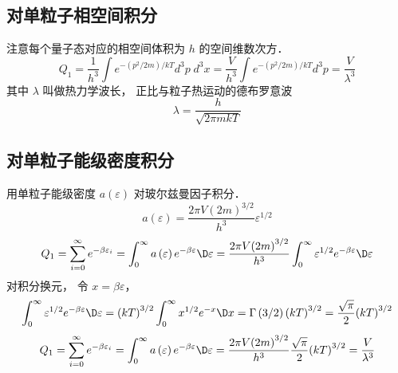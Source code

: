 \subsection{对单粒子相空间积分}
注意每个量子态对应的相空间体积为 $h$ 的空间维数次方．
\begin{equation}
{Q_1} = \frac{1}{{{h^3}}}\int {{e^{ - ({p^2}/2m)/kT}}{d^3}p\;{d^3}x}  = \frac{V}{{{h^3}}}\int {{e^{ - ({p^2}/2m)/kT}}{d^3}p}  = \frac{V}{{{\lambda ^3}}}
\end{equation}
其中 $\lambda $ 叫做热力学波长， 正比与粒子热运动的德布罗意波
\begin{equation}
\lambda  = \frac{h}{{\sqrt {2\pi mkT} }}
\end{equation}

\subsection{对单粒子能级密度积分}
用单粒子能级密度 $a\left( \varepsilon  \right)$ 对玻尔兹曼因子积分．
\begin{equation}
    a\left( \varepsilon  \right) = \frac{{2\pi V{{\left( {2m} \right)}^{3/2}}}}{{{h^3}}}{\varepsilon ^{1/2}}
\end{equation}
\begin{equation}
   {Q_1} = \sum\limits_{i = 0}^\infty  {{e^{ - \beta {\varepsilon _i}}}}  = \int_0^\infty  {a\left( \varepsilon  \right){e^{ - \beta \varepsilon }}\D \varepsilon }  \\
   = \frac{{2\pi V{{\left( {2m} \right)}^{3/2}}}}{{{h^3}}}\int_0^\infty  {{\varepsilon ^{1/2}}{e^{ - \beta \varepsilon }}\D \varepsilon }
\end{equation}
  对积分换元， 令 $x = \beta \varepsilon $， 
\begin{equation}
    \int_0^\infty  {{\varepsilon ^{1/2}}{e^{ - \beta \varepsilon }}\D \varepsilon } = {\left( {kT} \right)^{3/2}}\int_0^\infty  {{x^{1/2}}{e^{ - x}}\D x}
    = \Gamma \left( {3/2} \right){\left( {kT} \right)^{3/2}}
    = \frac{{\sqrt \pi  }}{2}{\left( {kT} \right)^{3/2}}
\end{equation}
\begin{equation}
{Q_1} = \sum\limits_{i = 0}^\infty  {{e^{ - \beta {\varepsilon _i}}}}  = \int_0^\infty  {a\left( \varepsilon  \right){e^{ - \beta \varepsilon }}\D\varepsilon } = \frac{{2\pi V{{\left( {2m} \right)}^{3/2}}}}{{{h^3}}}\frac{{\sqrt \pi  }}{2}{\left( {kT} \right)^{3/2}}  = \frac{V}{{{\lambda ^3}}}
\end{equation}

